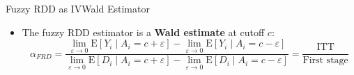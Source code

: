 \documentclass[hyperref={pdfpagelabels=false}]{beamer}
\begin{document}
\begin{frame}{Fuzzy RDD as IV}{Wald Estimator}

\begin{itemize}
    \item The fuzzy RDD estimator is a \textbf{Wald estimate} at cutoff $c$:
    \begin{equation*}
        \alpha_{FRD}
        =
        \frac{
          \displaystyle
          \lim_{\varepsilon\rightarrow 0}
          \mathrm{E}[Y_{i}\mid A_{i}=c+\varepsilon]
          -
          \lim_{\varepsilon\rightarrow 0}
          \mathrm{E}[Y_{i}\mid A_{i}=c-\varepsilon]
        }{
          \displaystyle
          \lim_{\varepsilon\rightarrow 0}
          \mathrm{E}[D_{i}\mid A_{i}=c+\varepsilon]
          -
          \lim_{\varepsilon\rightarrow 0}
          \mathrm{E}[D_{i}\mid A_{i}=c-\varepsilon]
        }
        =
        \frac{\text{ITT}}{\text{First stage}}
    \end{equation*}


\end{itemize}
\end{frame}
\end{document}
